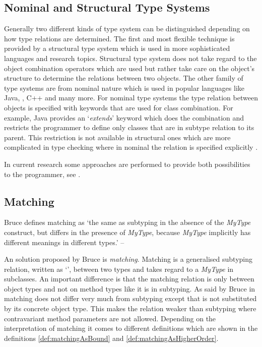 \subsection{Nominal and Structural Type Systems}
Generally two different kinds of type system can be distinguished
depending on how type relations are determined. The first and most
flexible technique is provided by a structural type system which is used
in more sophisticated languages and research topics. Structural type
system does not take regard to the object combination operators which
are used but rather take care on the object's structure to determine the
relations between two objects. The other family of type systems are from
nominal nature which is used in popular languages like Java, \cs, C++
and many more. For nominal type systems the type relation between objects
is specified with keywords that are used for class combination. For
example, Java provides an `\emph{extends}' keyword which does the combination
and restricts the programmer to define only classes that are in subtype
relation to its parent. This restriction is not available in structural
ones which are more complicated in type checking where in nominal the
relation is specified explicitly \cite{malayeri_integrating_2008,pierce_types_2002}.

In current research some approaches are performed
to provide both possibilities to the programmer, see
\cite{findler_semantic_2004,gil_whiteoak:_2008,malayeri_integrating_2008}.

\subsection{Matching}
\label{subsec:matching}
\begin{prop}[Matching]
	\label{prop:matching}
	Bruce defines matching as `the same as subtyping in the absence
	of the \emph{MyType} construct, but differs in the presence of
	\emph{MyType}, because \emph{MyType} implicitly has different
	meanings in different types.' -- \cite{bruce_foundations_2002}
\end{prop}

An solution proposed by Bruce \cite{bruce_binary_1995} is
\emph{matching}. Matching is a generalised subtyping relation, written
as `\match', between two types and takes regard to a \emph{MyType} in
subclasses. An important difference is that the matching relation is only
between object types and not on method types like it is in subtyping. As
said by Bruce in \cite{bruce_foundations_2002} matching does not differ
very much from subtyping except that \mytype is not substituted by its
concrete object type. This makes the relation weaker than subtyping
where contravariant method parameters are not allowed. Depending
on the interpretation of matching it comes to different
definitions which are shown in the definitions
\ref{def:matchingAsBound} and \ref{def:matchingAsHigherOrder}.

